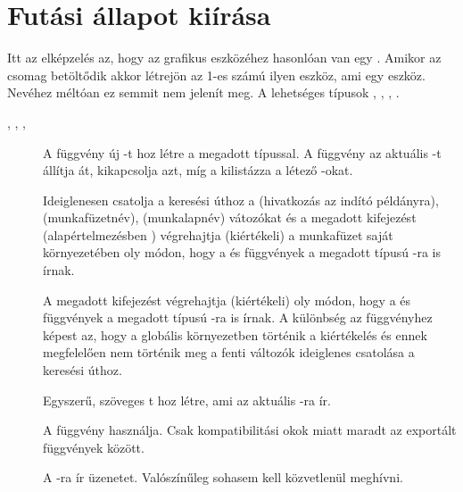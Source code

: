 \section{Futási állapot kiírása}\label{sec:4.2}

Itt az elképzelés az, hogy az  grafikus eszközéhez hasonlóan
van egy . Amikor 
az  csomag betöltődik akkor létrejön az 1-es számú ilyen
eszköz, ami egy  eszköz. 
Nevéhez méltóan ez semmit nem jelenít meg. A lehetséges
 típusok , , ,
.

\begin{description}
\item[, , ,
  ]
  A  függvény új
  -t hoz létre a megadott típussal. A
   függvény az 
  aktuális -t állítja át, 
  kikapcsolja azt, míg a 
   kilistázza a létező -okat.  
\item[] Ideiglenesen csatolja a keresési úthoz a
  (hivatkozás az indító  példányra),
   (munkafüzetnév),  (munkalapnév)
  vátozókat és a 
  megadott kifejezést (alapértelmezésben )
  végrehajtja (kiértékeli) a munkafüzet saját  környezetében
  oly módon, hogy a   és  
  függvények a megadott  típusú -ra is írnak.   
\item[] A
  megadott kifejezést végrehajtja (kiértékeli) oly módon, hogy a
   és   függvények a megadott
  típusú -ra is 
  írnak.  A különbség az  függvényhez képest az, hogy a
  globális környezetben történik a kiértékelés és ennek megfelelően
  nem történik meg a fenti változók ideiglenes csatolása a keresési úthoz.
\item[] Egyszerű, szöveges t hoz létre, ami az
  aktuális -ra ír. 

\item[] A  függvény használja. Csak
  kompatibilitási okok miatt maradt az exportált függvények között.
  
\item[] A -ra ír
  üzenetet. Valószínűleg sohasem kell közvetlenül meghívni.
\end{description}

